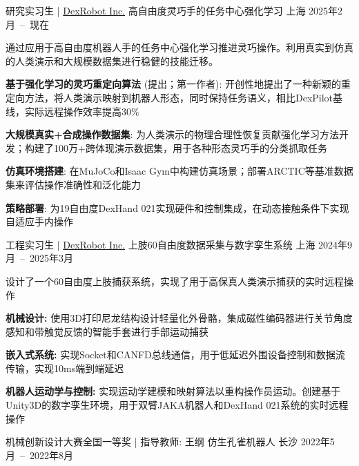 
\vspace{-8mm}

\begin{cventries}

    \cventry
      {研究实习生 | \href{https://dex-robot.com}{DexRobot Inc.}} %
      {高自由度灵巧手的任务中心强化学习} %
      {上海} %
      {2025年2月~--~现在} %
      {
        通过应用于高自由度机器人手的任务中心强化学习推进灵巧操作。利用真实到仿真的人类演示和大规模数据集进行稳健的技能迁移。
        \begin{cvitems}
          \item{\textbf{基于强化学习的灵巧重定向算法} (提出；第一作者): 开创性地提出了一种新颖的重定向方法，将人类演示映射到机器人形态，同时保持任务语义，相比DexPilot基线，实际远程操作效率提高30\%}
          \item{\textbf{大规模真实+合成操作数据集}: 为人类演示的物理合理性恢复贡献强化学习方法开发；构建了100万+跨体现演示数据集，用于各种形态灵巧手的分类抓取任务}
          \item{\textbf{仿真环境搭建}: 在MuJoCo和Isaac Gym中构建仿真场景；部署ARCTIC等基准数据集来评估操作准确性和泛化能力}
          \item{\textbf{策略部署}: 为19自由度DexHand 021实现硬件和控制集成，在动态接触条件下实现自适应手内操作}
        \end{cvitems}
      }
  \cventry
    {工程实习生 | \href{https://dex-robot.com}{DexRobot Inc.}} %
    {上肢60自由度数据采集与数字孪生系统} %
    {上海} %
    {2024年9月~--~2025年3月} %
    {
      设计了一个60自由度上肢捕获系统，实现了用于高保真人类演示捕获的实时远程操作
      \begin{cvitems}
        \item{\textbf{机械设计:} 使用3D打印尼龙结构设计轻量化外骨骼，集成磁性编码器进行关节角度感知和带触觉反馈的智能手套进行手部运动捕获}
        \item{\textbf{嵌入式系统:} 实现Socket和CANFD总线通信，用于低延迟外围设备控制和数据流传输，实现10ms端到端延迟}
        \item{\textbf{机器人运动学与控制:} 实现运动学建模和映射算法以重构操作员运动。创建基于Unity3D的数字孪生环境，用于双臂JAKA机器人和DexHand 021系统的实时远程操作}
      \end{cvitems}
    }
    \cventry
      {机械创新设计大赛全国一等奖 | 指导教师: 王纲} %
      {仿生孔雀机器人} %
      {长沙} %
      {2022年5月~--~2022年8月} %

\end{cventries}
